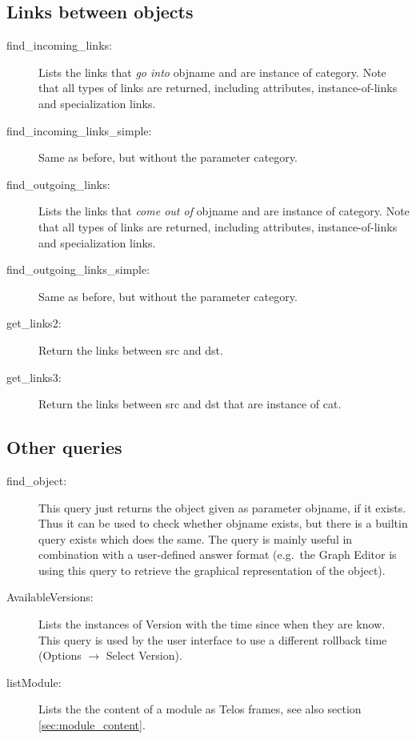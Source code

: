 \subsection{Links between objects}

\begin{description}
\item[find\_incoming\_links:] Lists the links that {\em go into} {\ttfamily objname} and are instance
of {\ttfamily category}. Note that all types of links are returned, including attributes,
instance-of-links and specialization links.
\item[find\_incoming\_links\_simple:] Same as before, but without the parameter {\ttfamily category}.
\item[find\_outgoing\_links:] Lists the links that {\em come out of} {\ttfamily objname} and are instance
of {\ttfamily category}. Note that all types of links are returned, including attributes,
instance-of-links and specialization links.
\item[find\_outgoing\_links\_simple:] Same as before, but without the parameter {\ttfamily category}.
\item[get\_links2:] Return the links between {\ttfamily src} and {\ttfamily dst}.
\item[get\_links3:] Return the links between {\ttfamily src} and {\ttfamily dst} that are
instance of {\ttfamily cat}.
\end{description}

\subsection{Other queries}

\begin{description}
\item[find\_object:] This query just returns the object given as parameter {\ttfamily objname},
if it exists. Thus it can be used to check whether {\ttfamily objname} exists, but
there is a builtin query {\ttfamily exists} which does the same. The query is
mainly useful in combination with a user-defined answer format (e.g.\ the Graph Editor
is using this query to retrieve the graphical representation of the object).
\item[AvailableVersions:] Lists the instances of {\ttfamily Version} with
the time since when they are know. This query is used by the user interface
to use a different rollback time (Options $\rightarrow$ Select Version).
\item[listModule:] Lists the the content of a module as Telos frames, see
also section \ref{sec:module_content}.
\end{description}


